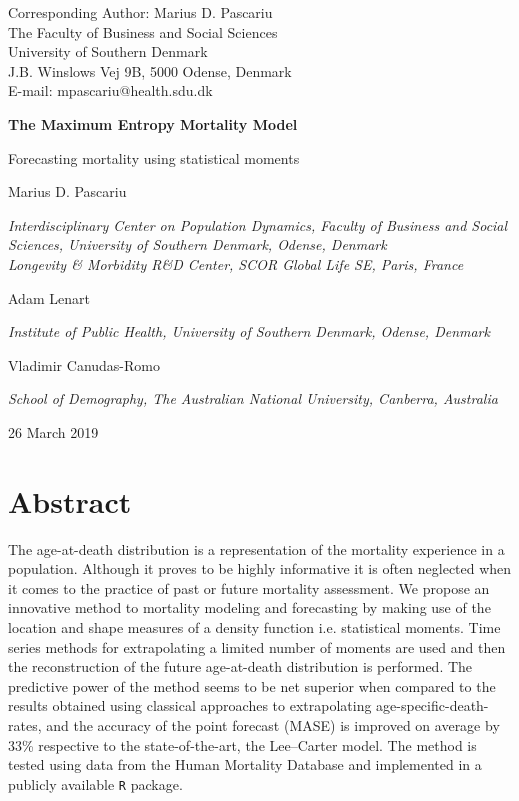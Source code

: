 \documentclass[T0_MEM]{subfiles}
\begin{document}
\begin{titlepage}
Corresponding Author: Marius D. Pascariu\\
The Faculty of Business and Social Sciences\\
University of Southern Denmark\\
J.B. Winslows Vej 9B, 5000 Odense, Denmark\\
E-mail: mpascariu@health.sdu.dk\\

	\centering
	{\quad\par\vspace{1cm}}
	{\huge\bfseries The Maximum Entropy Mortality Model\par}
	{\large Forecasting mortality using statistical moments\par}
	\vspace{1cm}
	{\Large Marius D. Pascariu\par}
	{\itshape Interdisciplinary Center on Population Dynamics, Faculty of Business and Social Sciences, University of Southern Denmark, Odense, Denmark\\
	Longevity \& Morbidity R\&D Center, SCOR Global Life SE, Paris, France\\}
	\vspace{0.2cm}
	{\Large Adam Lenart\par}
	{\itshape Institute of Public Health, University of Southern Denmark, Odense, Denmark\\}
	\vspace{0.2cm}
	{\Large Vladimir Canudas-Romo\par}
	{\itshape School of Demography, The Australian National University, Canberra, Australia\\}
	\vfill

	{\large 26 March 2019\par}
	\vspace{0.2cm}
\end{titlepage}

\section*{Abstract}

The age-at-death distribution is a representation of the mortality experience in a population. Although it proves to be highly informative it is often neglected when it comes to the practice of past or future mortality assessment. We propose an innovative method to mortality modeling and forecasting by making use of the location and shape measures of a density function i.e. statistical moments. Time series methods for extrapolating a limited number of moments are used and then the reconstruction of the future age-at-death distribution is performed. The predictive power of the method seems to be net superior when compared to the results obtained using classical approaches to extrapolating age-specific-death-rates, and the accuracy of the point forecast (MASE) is improved
on average by 33\% respective to the state-of-the-art, the Lee--Carter model. The method is tested using data from the Human Mortality Database and implemented in a publicly available \texttt{R} package.
\end{document}
